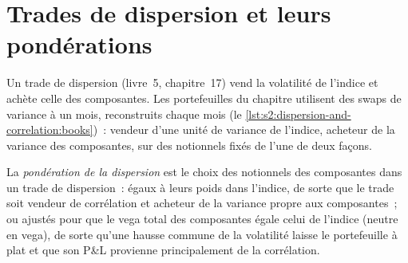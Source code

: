 \begin{omfigure}

\label{fig:s2:dispersion-and-correlation:cor}
\end{omfigure}

\section{Trades de dispersion et leurs pondérations}

Un trade de dispersion (livre~5, chapitre~17) vend la volatilité de l'indice et achète celle des composantes. Les portefeuilles du chapitre utilisent des swaps de variance à un mois, reconstruits
chaque mois (le \cref{lst:s2:dispersion-and-correlation:books})~: vendeur d'une unité de variance de l'indice, acheteur de la variance des composantes, sur des notionnels fixés de l'une de deux façons.

\begin{definition}\label{def:s2:dispersion-and-correlation:weighting}
La \emph{pondération de la dispersion} est le choix des notionnels des composantes dans un trade de dispersion~: égaux à leurs poids dans l'indice, de sorte
que le trade soit vendeur de corrélation et acheteur de la variance propre aux composantes~; ou ajustés pour que le vega total des composantes égale celui de l'indice
(neutre en vega), de sorte qu'une hausse commune de la volatilité laisse le portefeuille à plat et que son P\&L provienne principalement de la corrélation.
\end{definition}


